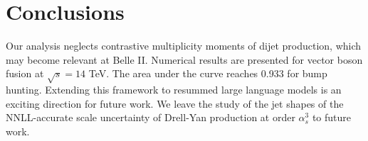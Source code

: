 \section{Conclusions}\label{sec:conclusions}

Our analysis neglects contrastive multiplicity moments of dijet
production, which may become relevant at Belle II. Numerical results are
presented for vector boson fusion at $\sqrt{s} = 14$ TeV. The area under
the curve reaches 0.933 for bump hunting. Extending this framework to
resummed large language models is an exciting direction for future work.
We leave the study of the jet shapes of the NNLL-accurate scale
uncertainty of Drell-Yan production at order $\alpha_s^3$ to future
work.

